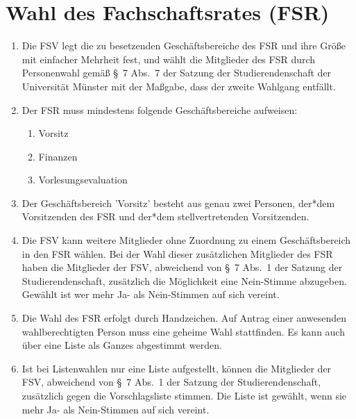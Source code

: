 \section{Wahl des Fachschaftsrates (FSR)}
\begin{enumerate}
	\item \label{abs:wahl1} Die FSV legt die zu besetzenden Geschäftsbereiche des FSR und ihre Größe mit einfacher Mehrheit fest, und wählt die Mitglieder des FSR durch Personenwahl gemäß §~7 Abs.~7 der Satzung der Studierendenschaft der Universität Münster mit der Maßgabe, dass der zweite Wahlgang entfällt.
	\item \label{abs:geschaeftsbereiche} Der FSR muss mindestens folgende Geschäftsbereiche aufweisen:
	\begin{enumerate}
		\item Vorsitz
		\item Finanzen
		\item Vorlesungsevaluation
	\end{enumerate}
	\item Der Geschäftsbereich 'Vorsitz' besteht aus genau zwei Personen, der*dem Vorsitzenden des FSR und der*dem stellvertretenden Vorsitzenden.
	\item Die FSV kann weitere Mitglieder ohne Zuordnung zu einem Geschäftsbereich in den FSR wählen. Bei der Wahl dieser zusätzlichen Mitglieder des FSR haben die Mitglieder der FSV, abweichend von §~7 Abs.~1 der Satzung der Studierendenschaft, zusätzlich die Möglichkeit eine Nein-Stimme abzugeben. Gewählt ist wer mehr Ja- als Nein-Stimmen auf sich vereint.
	\item Die Wahl des FSR erfolgt durch Handzeichen.
		Auf Antrag einer anwesenden wahlberechtigten Person muss eine geheime Wahl stattfinden.
		Es kann auch über eine Liste als Ganzes abgestimmt werden.
	\item Ist bei Listenwahlen nur eine Liste aufgestellt, können die Mitglieder der FSV, abweichend von §~7 Abs.~1 der Satzung der Studierendenschaft, zusätzlich gegen die Vorschlagsliste stimmen.
	Die Liste ist gewählt, wenn sie mehr Ja- als Nein-Stimmen auf sich vereint.
\end{enumerate}

